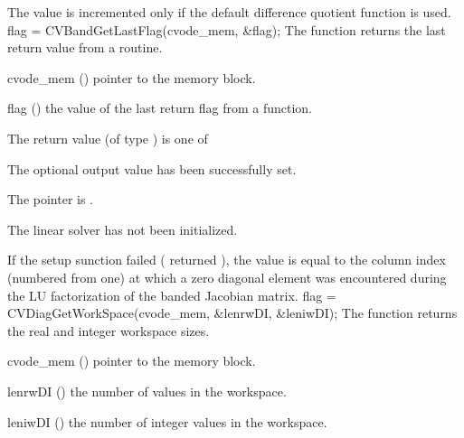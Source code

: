 {
  The value  is incremented only if the default 
   difference quotient function is used.
}
{
  flag = CVBandGetLastFlag(cvode\_mem, \&flag);
}
{
  The function  returns the
  last return value from a {\cvband} routine. 
}
{
  \begin{args}
  \item[cvode\_mem] ()
    pointer to the {\cvode} memory block.
  \item[flag] ()
    the value of the last return flag from a {\cvband} function.
  \end{args}
}
{
  The return value  (of type ) is one of
  \begin{args}
  \item[\Id{CVBAND\_SUCCESS}] 
    The optional output value has been successfully set.
  \item[\Id{CVBAND\_MEM\_NULL}]
    The  pointer is .
  \item[\Id{CVBAND\_LMEM\_NULL}]
    The {\cvband} linear solver has not been initialized.
  \end{args}
}
{
  If the {\cvband} setup sunction failed ( returned ),
  the value  is equal to the column index (numbered from one) at which
  a zero diagonal element was encountered during the LU factorization of the 
  banded Jacobian matrix.
}
%
%
{
  flag = CVDiagGetWorkSpace(cvode\_mem, \&lenrwDI, \&leniwDI);
}
{
  The function  returns the
  {\cvdiag} real and integer workspace sizes.
}
{
  \begin{args}
  \item[cvode\_mem] ()
    pointer to the {\cvode} memory block.
  \item[lenrwDI] ()
    the number of  values in the {\cvdiag} workspace.
  \item[leniwDI] ()
    the number of integer values in the {\cvdiag} workspace.
  \end{args}
}
